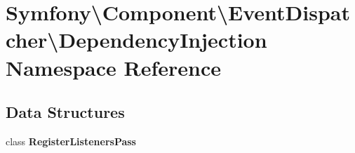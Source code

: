 \section{Symfony\textbackslash{}Component\textbackslash{}Event\+Dispatcher\textbackslash{}Dependency\+Injection Namespace Reference}
\label{namespace_symfony_1_1_component_1_1_event_dispatcher_1_1_dependency_injection}
\subsection*{Data Structures}
\begin{DoxyCompactItemize}
\item 
class {\bf Register\+Listeners\+Pass}
\end{DoxyCompactItemize}
